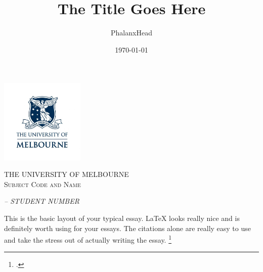 \documentclass[twoside, a4paper, 12pt]{article}
\title{The Title Goes Here}
\author{PhalanxHead}
\date{\today}
\begin{document}
\begin{titlepage}
    \centering
    \includegraphics[width=0.3\textwidth]{UniLogo.jpg}\par\vspace{1cm}
    {\scshape\Large THE UNIVERSITY OF MELBOURNE \\
              \large Subject Code and Name \par} %
    \vspace{1.5cm}
    {\Huge \thetitle \par}
    \vfill

    {\Large\itshape \theauthor \hspace{1em} -- \hspace{1em} STUDENT NUMBER \par}
    \vspace{1.5cm}
    {\Large \thedate}
\end{titlepage}
\pagestyle{plain}

\begin{doublespacing}
This is the basic layout of your typical essay. {\LaTeX} looks really nice
and is definitely worth using for your essays. The citations alone are really
easy to use and take the stress out of actually writing the essay. \footcite{PhalanxHead_2017}
\par\vspace{1em}

\lipsum[1-5]

\end{doublespacing}

\nocite{*}
\newpage

\printbibliography
\end{document}
